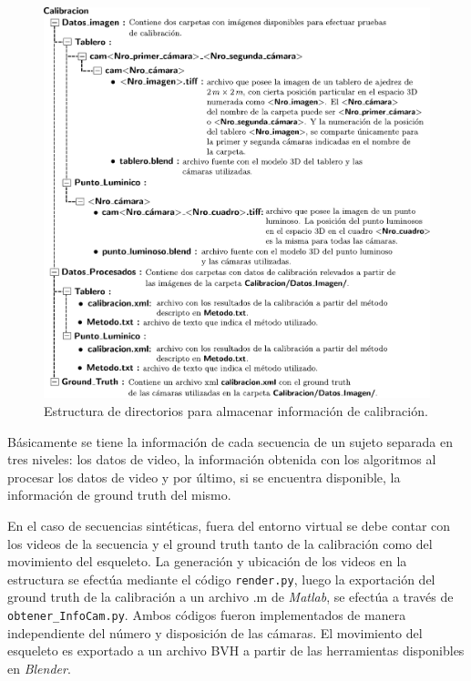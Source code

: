 \begin{figure}[ht!]
\includegraphics[scale=0.695]{img/Base_Datos/Estructura_directorios2.pdf}
\caption{Estructura de directorios para almacenar información de calibración.}
\label{Estructura_directorios2}
\end{figure}



Básicamente se tiene la información de cada secuencia de un sujeto separada en tres niveles: los datos de video, la información obtenida con los algoritmos al procesar los datos de video y por último,  si se encuentra disponible, la información de ground truth del mismo.


En el caso de secuencias sintéticas, fuera del entorno virtual se debe contar con los videos de la secuencia y el ground truth tanto de la calibración como del movimiento del esqueleto. 
La generación y ubicación de los videos en la estructura se efectúa mediante el código  \texttt{render.py}, luego la exportación del ground truth de la calibración a un archivo .m de \textit{Matlab}, se efectúa a través de \texttt{obtener\_InfoCam.py}. Ambos códigos fueron implementados de manera independiente del número y disposición de las cámaras. El movimiento del esqueleto es exportado a un archivo BVH a partir de las herramientas disponibles en \textit{Blender}.


